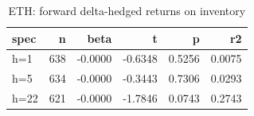 \begin{table}
\caption{ETH: forward delta-hedged returns on inventory}
\label{tab:t6_dh_returns_ETH}
\begin{tabular}{lrrrrr}
\toprule
spec & n & beta & t & p & r2 \\
\midrule
h=1 & 638 & -0.0000 & -0.6348 & 0.5256 & 0.0075 \\
h=5 & 634 & -0.0000 & -0.3443 & 0.7306 & 0.0293 \\
h=22 & 621 & -0.0000 & -1.7846 & 0.0743 & 0.2743 \\
\bottomrule
\end{tabular}
\end{table}
